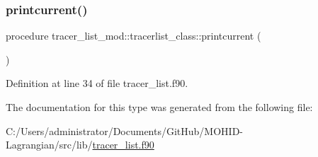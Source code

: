 \subsubsection{\texorpdfstring{printcurrent()}{printcurrent()}}
{\footnotesize\ttfamily procedure tracer\+\_\+list\+\_\+mod\+::tracerlist\+\_\+class\+::printcurrent (\begin{DoxyParamCaption}{ }\end{DoxyParamCaption})\hspace{0.3cm}{\ttfamily [private]}}



Definition at line 34 of file tracer\+\_\+list.\+f90.



The documentation for this type was generated from the following file\+:\begin{DoxyCompactItemize}
\item 
C\+:/\+Users/administrator/\+Documents/\+Git\+Hub/\+M\+O\+H\+I\+D-\/\+Lagrangian/src/lib/\mbox{\hyperlink{tracer__list_8f90}{tracer\+\_\+list.\+f90}}\end{DoxyCompactItemize}
